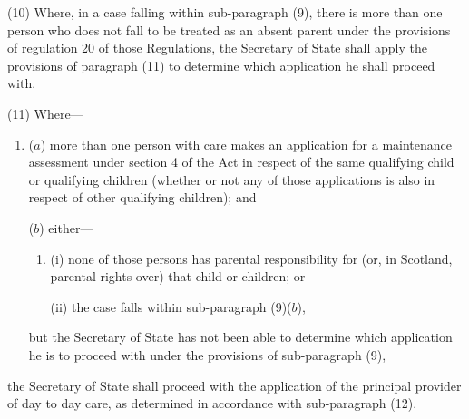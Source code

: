 \documentclass[a4paper,12pt]{article}
\begin{document}
\begin{sloppypar}
(10) Where, in a case falling within sub-paragraph (9), there is more than one person who does not fall to be treated as an absent parent under the provisions of regulation 20 of those Regulations, 
the Secretary of State  %
shall apply the provisions of paragraph (11) to determine which application he shall proceed with.
\end{sloppypar}

(11) Where—
\begin{enumerate}\item[]
($a$) more than one person with care makes an application for a maintenance assessment under section 4 of the Act in respect of the same qualifying child or qualifying children (whether or not any of those applications is also in respect of other qualifying children); and

($b$) either—
\begin{enumerate}\item[]
(i) none of those persons has parental responsibility for (or, in Scotland, parental rights over) that child or children; or

(ii) the case falls within sub-paragraph (9)($b$),
\end{enumerate}
but 
the Secretary of State  %
has not been able to determine which application he is to proceed with under the provisions of sub-paragraph (9),
\end{enumerate}
the Secretary of State  %
shall proceed with the application of the principal provider of day to day care, as determined in accordance with sub-paragraph (12).
\end{document}
